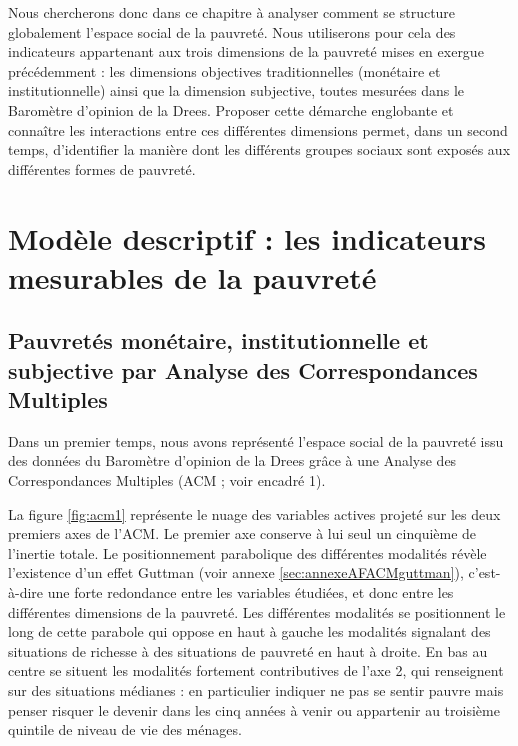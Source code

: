 \documentclass[12pt,a4paper]{reedthesis}
\begin{document}
Nous chercherons donc dans ce chapitre à analyser comment se structure globalement l'espace social de la pauvreté. Nous utiliserons pour cela des indicateurs appartenant aux trois dimensions de la pauvreté mises en exergue précédemment : les dimensions objectives traditionnelles (monétaire et institutionnelle) ainsi que la dimension subjective, toutes mesurées dans le Baromètre d'opinion de la Drees. Proposer cette démarche englobante et connaître les interactions entre ces différentes dimensions permet, dans un second temps, d'identifier la manière dont les différents groupes sociaux sont exposés aux différentes formes de pauvreté.

\hypertarget{sec:esexplodescri}{%
\section{Modèle descriptif : les indicateurs mesurables de la pauvreté}\label{sec:esexplodescri}}

\hypertarget{sec:esexplodescriACM}{%
\subsection{Pauvretés monétaire, institutionnelle et subjective par Analyse des Correspondances Multiples}\label{sec:esexplodescriACM}}

Dans un premier temps, nous avons représenté l'espace social de la pauvreté issu des données du Baromètre d'opinion de la Drees grâce à une Analyse des Correspondances Multiples (ACM ; voir encadré 1).

La figure \ref{fig:acm1} représente le nuage des variables actives projeté sur les deux premiers axes de l'ACM. Le premier axe conserve à lui seul un cinquième de l'inertie totale. Le positionnement parabolique des différentes modalités révèle l'existence d'un effet Guttman (voir annexe \ref{sec:annexeAFACMguttman}), c'est-à-dire une forte redondance entre les variables étudiées, et donc entre les différentes dimensions de la pauvreté. Les différentes modalités se positionnent le long de cette parabole qui oppose en haut à gauche les modalités signalant des situations de richesse à des situations de pauvreté en haut à droite. En bas au centre se situent les modalités fortement contributives de l'axe 2, qui renseignent sur des situations médianes : en particulier indiquer ne pas se sentir pauvre mais penser risquer le devenir dans les cinq années à venir ou appartenir au troisième quintile de niveau de vie des ménages.
\end{document}
